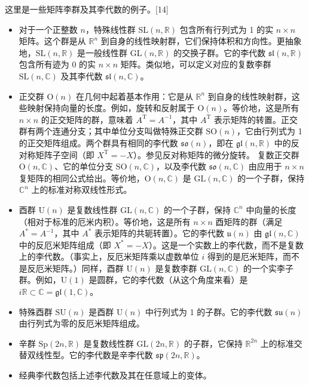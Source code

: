 这里是一些矩阵李群及其李代数的例子。[14]
\begin{itemize}
\item 对于一个正整数 \( n \)，特殊线性群 \( \mathrm{SL}(n, \mathbb{R}) \) 包含所有行列式为 1 的实 \( n \times n \) 矩阵。这个群是从 \( \mathbb{R}^n \) 到自身的线性映射群，它们保持体积和方向性。更抽象地，\( \mathrm{SL}(n, \mathbb{R}) \) 是一般线性群 \( \mathrm{GL}(n, \mathbb{R}) \) 的交换子群。它的李代数 \( \mathfrak{sl}(n, \mathbb{R}) \) 包含所有迹为 0 的实 \( n \times n \) 矩阵。类似地，可以定义对应的复数李群 \( \mathrm{SL}(n, \mathbb{C}) \) 及其李代数 \( \mathfrak{sl}(n, \mathbb{C}) \)。
\item 正交群 \( \mathrm{O}(n) \) 在几何中起着基本作用：它是从 \( \mathbb{R}^n \) 到自身的线性映射群，这些映射保持向量的长度。例如，旋转和反射属于 \( \mathrm{O}(n) \)。等价地，这是所有 \( n \times n \) 的正交矩阵的群，意味着 \( A^{\mathrm{T}} = A^{-1} \)，其中 \( A^{\mathrm{T}} \) 表示矩阵的转置。正交群有两个连通分支；其中单位分支叫做特殊正交群 \( \mathrm{SO}(n) \)，它由行列式为 1 的正交矩阵组成。两个群具有相同的李代数 \( \mathfrak{so}(n) \)，即在 \( \mathfrak{gl}(n, \mathbb{R}) \) 中的反对称矩阵子空间（即 \( X^{\mathrm{T}} = -X \)）。参见反对称矩阵的微分旋转。
复数正交群 \( \mathrm{O}(n, \mathbb{C}) \)、它的单位分支 \( \mathrm{SO}(n, \mathbb{C}) \)，以及李代数 \( \mathfrak{so}(n, \mathbb{C}) \) 由应用于 \( n \times n \) 复矩阵的相同公式给出。等价地，\( \mathrm{O}(n, \mathbb{C}) \) 是 \( \mathrm{GL}(n, \mathbb{C}) \) 的一个子群，保持 \( \mathbb{C}^n \) 上的标准对称双线性形式。
\item 酉群 \( \mathrm{U}(n) \) 是复数线性群 \( \mathrm{GL}(n, \mathbb{C}) \) 的一个子群，保持 \( \mathbb{C}^n \) 中向量的长度（相对于标准的厄米内积）。等价地，这是所有 \( n \times n \) 酉矩阵的群（满足 \( A^{*} = A^{-1} \)，其中 \( A^{*} \) 表示矩阵的共轭转置）。它的李代数 \( \mathfrak{u}(n) \) 由 \( \mathfrak{gl}(n, \mathbb{C}) \) 中的反厄米矩阵组成（即 \( X^{*} = -X \)）。这是一个实数上的李代数，而不是复数上的李代数。（事实上，反厄米矩阵乘以虚数单位 \( i \) 得到的是厄米矩阵，而不是反厄米矩阵。）同样，酉群 \( \mathrm{U}(n) \) 是复数李群 \( \mathrm{GL}(n, \mathbb{C}) \) 的一个实李子群。例如，\( \mathrm{U}(1) \) 是圆群，它的李代数（从这个角度来看）是 \( i\mathbb{R} \subset \mathbb{C} = \mathfrak{gl}(1, \mathbb{C}) \)。
\item 特殊酉群 \( \mathrm{SU}(n) \) 是酉群 \( \mathrm{U}(n) \) 中行列式为 1 的子群。它的李代数 \( \mathfrak{su}(n) \) 由行列式为零的反厄米矩阵组成。
\item 辛群 \( \mathrm{Sp}(2n, \mathbb{R}) \) 是复数线性群 \( \mathrm{GL}(2n, \mathbb{R}) \) 的子群，它保持 \( \mathbb{R}^{2n} \) 上的标准交替双线性型。它的李代数是辛李代数 \( \mathfrak{sp}(2n, \mathbb{R}) \)。
\item 经典李代数包括上述李代数及其在任意域上的变体。
\end{itemize}
